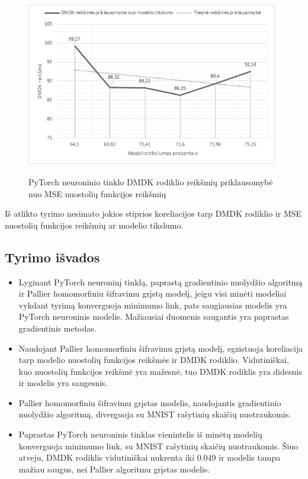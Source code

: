 \documentclass{VUMIFInfBakalaurinis}
\begin{document}
\begin{figure}[h]
  \centering
  \includegraphics[width=11cm,height=8cm,keepaspectratio]{img/pap_tyr_2.png}
  \caption{PyTorch neuroninio tinklo DMDK rodiklio reikšmių priklausomybė nuo MSE nuostolių funkcijos reikšmių}
  \label{fig:PyTorch neuroninio tinklo DMDK rodiklio reikšmių priklausomybė nuo MSE nuostolių funkcijos reikšmių}
\end{figure}

\par Iš atlikto tyrimo nesimato jokios stiprios koreliacijos tarp DMDK rodiklio ir MSE nuostolių funkcijos reikšmių ar modelio tikslumo.

\subsection{Tyrimo išvados}

\begin{itemize}
    \item Lyginant PyTorch neuroninį tinklą, paprastą gradientinio nuolydžio algoritmą ir Pallier homomorfiniu šifravimu grįstą modelį, jeigu visi minėti modeliai vykdant tyrimą konverguoja minimumo link, pats saugiausias modelis yra PyTorch neuroninis modelis. Mažiausiai duomenis saugantis yra paprastas gradientinis metodas.
    \item Naudojant Pallier homomorfiniu šifravimu grįstą modelį, egzistuoja koreliacija tarp modelio nuostolių funkcijos reikšmės ir DMDK rodiklio. Vidutiniškai, kuo nuostolių funkcijos reikšmė yra mažesnė, tuo DMDK rodiklis yra didesnis ir modelis yra saugesnis.
    \item Pallier homomorfiniu šifravimu grįstas modelis, naudojantis gradientinio nuolydžio algoritmą, diverguoja su MNIST rašytinių skaičių nuotraukomis.
    \item Paprastas PyTorch neuroninis tinklas vienintelis iš minėtų modelių konverguoja minimumo link, su MNIST rašytinių skaičių nuotraukomis. Šiuo atveju, DMDK rodiklis vidutiniškai nukrenta iki 0.049 ir modelis tampa mažiau saugus, nei Pallier algoritmu grįstas modelis.
\end{itemize}



\end{document}
